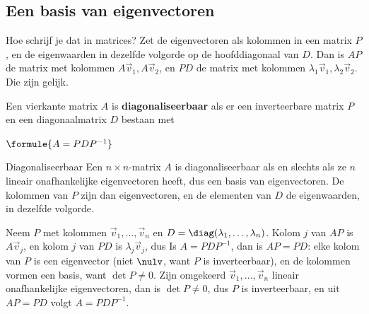 
\subsection{Een basis van eigenvectoren}

Hoe schrijf je dat in matrices? Zet de eigenvectoren als kolommen in een matrix $P$, en de eigenwaarden in dezelfde volgorde op de hoofddiagonaal van $D$. Dan is $AP$ de matrix met kolommen $A\vec v_1, A\vec v_2$, en $PD$ de matrix met kolommen $\lambda_1\vec v_1, \lambda_2\vec v_2$. Die zijn gelijk.

\begin{theorie}
Een vierkante matrix $A$ is \textbf{\textcolor{accent}{diagonaliseerbaar}} als er een inverteerbare matrix $P$ en een diagonaalmatrix $D$ bestaan met

\vspace{1mm}
\qquad $\formule{A = PDP^{-1}}$

\begin{stelling}{Diagonaliseerbaar}
Een $n \times n$-matrix $A$ is diagonaliseerbaar als en slechts als ze $n$ lineair onafhankelijke eigenvectoren heeft, dus een basis van eigenvectoren. De kolommen van $P$ zijn dan eigenvectoren, en de elementen van $D$ de eigenwaarden, in dezelfde volgorde.
\end{stelling}

\begin{bewijs}
Neem $P$ met kolommen $\vec v_1, \ldots, \vec v_n$ en $D = \diag(\lambda_1, \ldots, \lambda_n)$. Kolom $j$ van $AP$ is $A\vec v_j$, en kolom $j$ van $PD$ is $\lambda_j\vec v_j$, dus
Is $A = PDP^{-1}$, dan is $AP = PD$: elke kolom van $P$ is een eigenvector (niet $\nulv$, want $P$ is inverteerbaar), en de kolommen vormen een basis, want $\det P \neq 0$. Zijn omgekeerd $\vec v_1, \ldots, \vec v_n$ lineair onafhankelijke eigenvectoren, dan is $\det P \neq 0$, dus $P$ is inverteerbaar, en uit $AP = PD$ volgt $A = PDP^{-1}$.
\end{bewijs}
\end{theorie}

